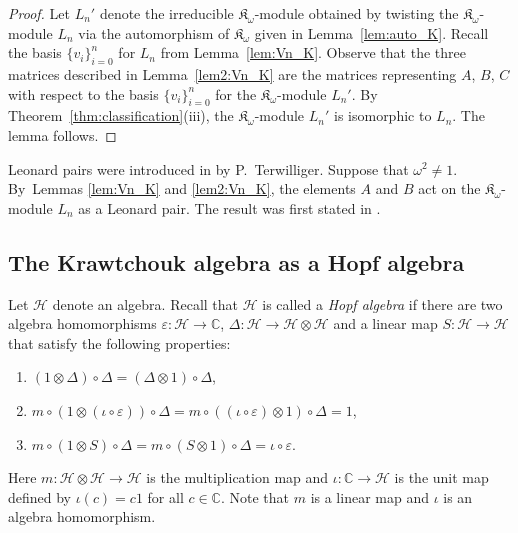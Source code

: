\documentclass[10pt,a4paper]{amsart}
\def\C{\mathbb C}
\def\H{\mathcal H}
\def\K{\mathfrak K_\omega}
\def\e{\varepsilon}
\numberwithin{equation}{section}
\begin{document}
\begin{proof}
Let $L_n'$ denote the irreducible $\K$-module obtained by twisting the $\K$-module $L_n$ via the automorphism of $\K$ given in Lemma~\ref{lem:auto_K}.
Recall the basis $\{v_i\}_{i=0}^n$ for $L_n$ from Lemma~\ref{lem:Vn_K}. Observe that the three matrices described in Lemma~\ref{lem2:Vn_K} are the matrices representing $A$, $B$, $C$ with respect to the basis $\{v_i\}_{i=0}^n$ for the $\K$-module $L_n'$.
By Theorem~\ref{thm:classification}(iii), the $\K$-module $L_n'$ is isomorphic to $L_n$. The lemma follows.
\end{proof}

Leonard pairs were introduced in \cite{LP-dual,Askeyscheme,lp&awrelation} by P.~Terwilliger. Suppose that $\omega^2\not=1$. By~Lemmas \ref{lem:Vn_K} and \ref{lem2:Vn_K}, the elements $A$ and $B$ act on the $\K$-module $L_n$ as a Leonard pair. The result was first stated in \cite[Theorem 6.3]{K&sl2}.

\subsection{The Krawtchouk algebra as a Hopf algebra}%

Let $\H$ denote an algebra.
Recall that $\H$ is called a {\it Hopf algebra} if there are two algebra homomorphisms $\e\colon \H\to \C$, $\Delta\colon \H\to \H \otimes \H$
and a linear map $S\colon \H\to \H$
that satisfy the following properties:
\begin{enumerate}\itemsep=0pt
\item[(H1)] $(1\otimes \Delta)\circ \Delta=(\Delta\otimes 1)\circ \Delta$,

\item[(H2)]
$m\circ(1\otimes (\iota \circ \e))\circ \Delta=m\circ( (\iota \circ \e)\otimes 1)\circ \Delta=1$,

\item[(H3)] $m\circ (1\otimes S)\circ \Delta=m\circ (S\otimes 1)\circ \Delta=\iota\circ \e$.
\end{enumerate}
Here $m\colon \H\otimes\H\to \H$ is the multiplication map and $\iota\colon \C\to \H$ is the unit map defined by $\iota(c)=c 1$ for all $c\in\C$.
Note that $m$ is a linear map and $\iota$ is an algebra homomorphism.
\end{document}

